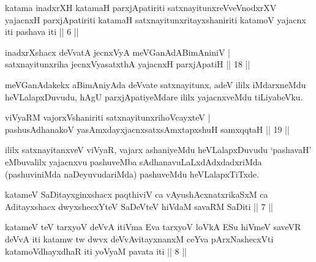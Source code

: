 
\begin{kandikeshl}
katama inadxrXH katamaH parxjApatiriti satxnayitunxreVveVnodxrXV yajacnxH parxjApatiriti katamaH satxnayitunxritayxshaniriti katamoV yajacnx iti pashava iti || 6 ||
\end{kandikeshl}


\begin{shl}
inadxrXshacx deVvatA jecnxVyA meVGanAdABimAniniV |\\
satxnayitunxriha jecnxVyasatxthA yajacnxH parxjApatiH \hfill || 18 ||
\end{shl}

\begin{artha}
meVGanAdakekx aBimAniyAda deVvate satxnayitunx, adeV ililx iMdarxneMdu heVLalapxDuvudu, hAgU parxjApatiyeMdare ililx yajacnxveMdu tiLiyabeVku.
\end{artha}


\begin{shl}
viVyaRM vajorxV\s shaniriti satxnayitunxrihoVcayxteV |\\
pashusAdhanakoV yasAmxdayxjacnxsatxsAmxtapxshuH samxqqtaH \hfill || 19 ||
\end{shl}

\begin{artha}
ililx satxnayitanxveV viVyaR, vajarx ashaniyeMdu heVLalapxDuvudu `pashavaH' eMbuvalilx yajacnxvu pashuveMba sAdhanavuLaLxdAdxdadxriMda (pashuviniMda naDeyuvudariMda) pashuveMdu heVLalapxTiTxde.
\end{artha}


\begin{kandikeshl}
katameV SaDitayxginxshacx paqthiviV ca vAyushAcxnatxrikaSxM ca Aditayxshacx dwyxshecxYteV SaDeVteV hiVdaM savaRM SaDiti || 7 ||
\end{kandikeshl}

\begin{kandikeshl}
katameV teV tarxyoV deVvA itiVma Eva tarxyoV loVkA ESu hiVmeV saveVR deVvA iti katamw tw dwvx deVvAvitayxnanxM ceYva pArxNashecxVti katamoV\s dhayxdhaR iti yoV\s yaM pavata iti || 8 ||
\end{kandikeshl}



